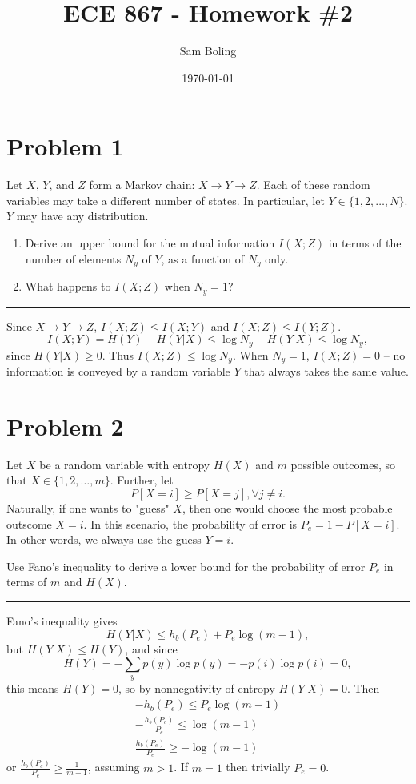 \documentclass{article}
\title{ECE 867 - Homework \#2}
\author{Sam Boling}
\date{\today}
\newcommand{\horline}
           {\begin{center}
              \noindent\rule{8cm}{0.4pt}
            \end{center}}
\begin{document}
\maketitle

\section*{Problem 1}
Let $X$, $Y$, and $Z$ form a Markov chain: $X \to Y \to Z$. Each of these
random variables may take a different number of states. In particular, let
$Y \in \{1, 2, \dots, N\}$. $Y$ may have any distribution.
\begin{enumerate}[label=(alph*)]
  \item{Derive an upper bound for the mutual information $I(X;Z)$ in terms
        of the number of elements $N_y$ of $Y$, as a function of $N_y$ only.
       }
  \item{What happens to $I(X;Z)$ when $N_y = 1$?}
\end{enumerate}
\horline
Since $X \to Y \to Z$, $I(X;Z) \leq I(X;Y)$ and $I(X;Z) \leq I(Y;Z)$.
$$
I(X;Y) = H(Y) - H(Y|X) \leq \log N_y - H(Y|X) \leq \log N_y,
$$
since $H(Y|X) \geq 0$. Thus $I(X;Z) \leq \log N_y$. When $N_y = 1$, 
$I(X;Z) = 0$ -- no information is conveyed by a random variable $Y$ that 
always takes the same value.

\section*{Problem 2}
Let $X$ be a random variable with entropy $H(X)$ and $m$ possible outcomes,
so that $X \in \{1, 2, \dots, m\}$. Further, let
$$
P[X=i] \geq P[X=j], \forall j \neq i.
$$
Naturally, if one wants to "guess" $X$, then one would choose the most
probable outscome $X=i$. In this scenario, the probability of error is
$P_e = 1 - P[X=i]$. In other words, we always use the guess $Y = i$.

Use Fano's inequality to derive a lower bound for the probability of error
$P_e$ in terms of $m$ and $H(X)$.
\horline
Fano's inequality gives
$$
H(Y|X) \leq h_b(P_e) + P_e \log (m - 1),
$$
but $H(Y|X) \leq H(Y)$, and since
$$
H(Y) = -\sum_y p(y) \log p(y) = -p(i) \log p(i) = 0,
$$
this means $H(Y) = 0$, so by nonnegativity of entropy $H(Y|X) = 0$. Then
\begin{align*}
-h_b(P_e) \leq P_e \log (m - 1) \\
-\frac{h_b(P_e)}{P_e} \leq \log (m-1) \\
\frac{h_b(P_e)}{P_e} \geq -\log (m-1)
\end{align*}
or $\frac{h_b(P_e)}{P_e} \geq \frac{1}{m-1}$, assuming $m > 1$. If $m = 1$
then trivially $P_e = 0$.
\end{document}

